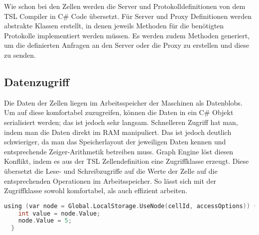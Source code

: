 Wie schon bei den Zellen werden die Server und Protokolldefinitionen von dem TSL Compiler in C\# Code übersetzt. Für Server und Proxy
Definitionen werden abstrakte Klassen erstellt, in denen jeweils Methoden für die benötigten Protokolle implementiert werden müssen.
Es werden zudem Methoden generiert, um die definierten Anfragen an den Server oder die Proxy zu erstellen und diese zu senden.


\subsection{Datenzugriff}
\label{geAccessor}

Die Daten der Zellen liegen im Arbeitsspeicher der Maschinen als Datenblobs. Um auf diese komfortabel zuzugreifen, können die Daten in ein C\# Objekt
serialisiert werden; das ist jedoch sehr langsam.
Schnelleren Zugriff hat man, indem man die Daten direkt im RAM manipuliert. Das ist jedoch deutlich schwieriger, da man das Speicherlayout der jeweiligen Daten
kennen und entsprechende Zeiger-Arithmetik betreiben muss. Graph Engine löst diesen Konflikt, indem es aus der TSL Zellendefinition eine Zugriffklasse erzeugt.
Diese übersetzt die Lese- und Schreibzugriffe auf die Werte der Zelle auf die entsprechenden Operationen im Arbeitsspeicher. So lässt sich mit der Zugriffklasse sowohl
komfortabel, als auch effizient arbeiten.

\begin{lstlisting}[language=c, caption={Bearbeitung einer Zelle mithilfe der Zugriffklasse}]
  using (var node = Global.LocalStorage.UseNode(cellId, accessOptions)) {
    int value = node.Value;
    node.Value = 5;
  }
\end{lstlisting}
